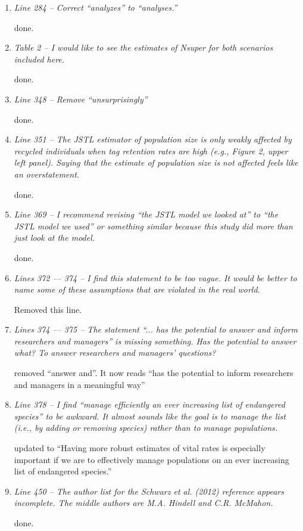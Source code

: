 \documentclass[12pt]{article}
\begin{document}
\begin{enumerate}
\begin{enumerate}
\item {\it Line 284 – Correct “analyzes” to “analyses.”} 

done.

\item {\it Table 2 – I would like to see the estimates of Nsuper for both scenarios included here.}

done.

\item {\it Line 348 – Remove “unsurprisingly”} 

done.

\item {\it Line 351 – The JSTL estimator of population size is only weakly affected by recycled individuals when tag retention rates are high (e.g., Figure 2, upper left panel). Saying that the estimate of population size is not affected feels like an overstatement.} 

done.

\item {\it Line 369 – I recommend revising “the JSTL model we looked at” to “the JSTL model we used” or something similar because this study did more than just look at the model.} 

done.

\item {\it Lines 372 –-- 374 – I find this statement to be too vague. It would be better to name some of these assumptions that are violated in the real world.}

Removed this line.

\item {\it Lines 374 --– 375 – The statement “... has the potential to answer and inform researchers and managers” is missing something. Has the potential to answer what? To answer researchers and managers’ questions?}

removed ``answer and''. It now reads ``has the potential to inform researchers and managers in a meaningful way''

\item {\it Line 378 – I find “manage efficiently an ever increasing list of endangered species” to be awkward. It almost sounds like the goal is to manage the list (i.e., by adding or removing species) rather than to manage populations.}

updated to ``Having more robust estimates of vital rates is especially important if we are to effectively manage populations on an ever increasing list of endangered species.''

\item {\it Line 450 – The author list for the Schwarz et al. (2012) reference appears incomplete. The middle authors are M.A. Hindell and C.R. McMahon.}

done.
\end{enumerate}

\end{enumerate}
\end{document}
